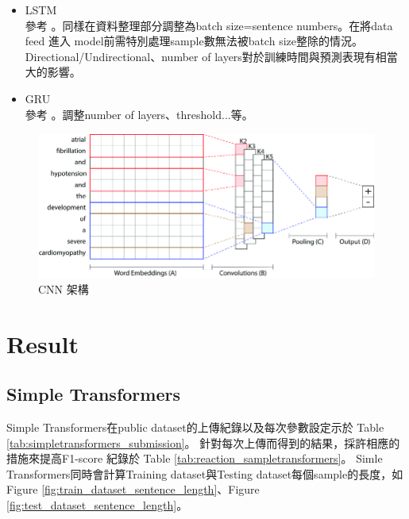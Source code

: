\documentclass[8pt,a4paper]{article}
\begin{document}
\begin{itemize}
\begin{itemize}
            \item LSTM\\
            參考 \cite{huang2015}。同樣在資料整理部分調整為batch size=sentence numbers。在將data feed 進入
            model前需特別處理sample數無法被batch size整除的情況。Directional/Undirectional、number of layers對於訓練時間與預測表現有相當大的影響。\\
            \item GRU\\
            參考 \cite{luo2017}。調整number of layers、threshold...等。\\
        \end{itemize}
\end{itemize}

\begin{figure}[H]
    \begin{center}
        \includegraphics[width=350pt]{./Figures/cnn_overview.png}
        \caption{CNN 架構 \cite{gehrmann2018}}
        \label{fig:cnn_overview}
    \end{center}
\end{figure}

\section*{Result} 
\label{sec:Result}

\subsection*{Simple Transformers}

Simple Transformers在public dataset的上傳紀錄以及每次參數設定示於 Table \ref{tab:simpletransformers_submission}。
針對每次上傳而得到的結果，採許相應的措施來提高F1-score 紀錄於 Table \ref{tab:reaction_sampletransformers}。
Simle Transformers同時會計算Training dataset與Testing dataset每個sample的長度，如 Figure \ref{fig:train_dataset_sentence_length}、Figure \ref{fig:test_dataset_sentence_length}。\\
\end{document}
